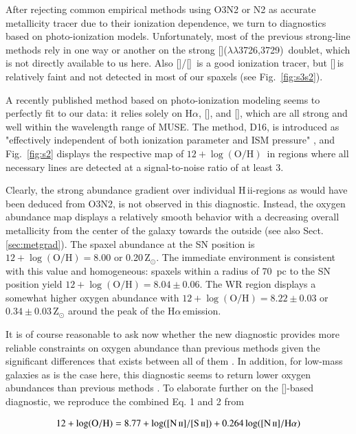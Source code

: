 \documentclass[traditabstract, referee]{aa}
\newcommand{\ha}{H$\alpha$}
\newcommand{\hii}{\mbox{H\,{\sc ii}}}
\newcommand{\oh}{12+\log(\mathrm{O/H})}
\newcommand{\sii}{[\ion{S}{ii}]}
\newcommand{\siii}{[\ion{S}{iii}]}
\newcommand{\oii}{[\ion{O}{ii}]}
\newcommand{\nii}{[\ion{N}{ii}]}
\begin{document}
After rejecting common empirical methods using O3N2 or N2 as accurate metallicity tracer due to their ionization dependence, we turn to diagnostics based on photo-ionization models. Unfortunately, most of the previous strong-line methods rely in one way or another on the strong \oii($\lambda\lambda$3726,3729)\, doublet\citep{2002ApJS..142...35K}, which is not directly available to us here. Also \siii/\sii\, is a good ionization tracer, but \siii\,is relatively faint and not detected in most of our spaxels (see Fig.~\ref{fig:s3s2}). 

A recently published method based on photo-ionization modeling \citep{2016Ap&SS.361...61D} seems to perfectly fit to our data: it relies solely on \ha, \nii, and \sii, which are all strong and well within the wavelength range of MUSE. The method, D16, is introduced as "effectively independent of both ionization parameter and ISM pressure" \citep{2016Ap&SS.361...61D}, and Fig.~\ref{fig:s2} displays the respective map of $\oh$\, in regions where all necessary lines are detected at a signal-to-noise ratio of at least 3.

Clearly, the strong abundance gradient over individual \hii-regions as would have been deduced from O3N2, is not observed in this diagnostic. Instead, the oxygen abundance map displays a relatively smooth behavior with a decreasing overall metallicity from the center of the galaxy towards the outside (see also Sect. \ref{sec:metgrad}). The spaxel abundance at the SN position is $\oh=8.00$ or 0.20\,Z$_{\odot}$. The immediate environment is consistent with this value and homogeneous: spaxels within a radius of 70~pc to the SN position yield $\oh = 8.04\pm 0.06$. The WR region displays a somewhat higher oxygen abundance with $\oh=8.22\pm 0.03$ or $0.34\pm0.03\,$Z$_{\odot}$ around the peak of the \ha\,emission.

It is of course reasonable to ask now whether the new \citet{2016Ap&SS.361...61D} diagnostic provides more reliable constraints on oxygen abundance than previous methods given the significant differences that exists between all of them \citep{2016arXiv161108595B}. In addition, for low-mass galaxies as is the case here, this diagnostic seems to return lower oxygen abundances than previous methods \citep{2016ApJ...823L..24K}. To elaborate further on the \sii-based diagnostic, we reproduce the combined Eq. 1 and 2 from \citet{2016Ap&SS.361...61D}

\begin{equation}
\label{eq:s2}
12+\log(\mathrm{O/H}) = 8.77 + \log([\ion{N}{ii}]/[\ion{S}{ii}]) + 0.264\log([\ion{N}{ii}]/\mathrm{H}\alpha)
\end{equation}
\end{document}
